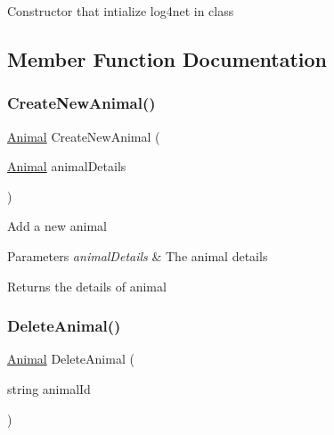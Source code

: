 Constructor that intialize log4net in class 



\subsection{Member Function Documentation}
\mbox{\label{classWildLifeTracker_1_1Repository_1_1AnimalRepo_a8242d740e31fff58cf32f374c7d35672}} 
\subsubsection{\texorpdfstring{Create\+New\+Animal()}{CreateNewAnimal()}}
{\footnotesize\ttfamily \hyperlink{classWildLifeTracker_1_1Models_1_1Animal}{Animal} Create\+New\+Animal (\begin{DoxyParamCaption}\item[{\hyperlink{classWildLifeTracker_1_1Models_1_1Animal}{Animal}}]{animal\+Details }\end{DoxyParamCaption})\hspace{0.3cm}{\ttfamily [inline]}}



Add a new animal 


\begin{DoxyParams}{Parameters}
{\em animal\+Details} & The animal details\\
\hline
\end{DoxyParams}
\begin{DoxyReturn}{Returns}
the details of animal 
\end{DoxyReturn}
\mbox{\label{classWildLifeTracker_1_1Repository_1_1AnimalRepo_aaa8df32c561515cee5569a3bbf1d82d9}} 
\subsubsection{\texorpdfstring{Delete\+Animal()}{DeleteAnimal()}}
{\footnotesize\ttfamily \hyperlink{classWildLifeTracker_1_1Models_1_1Animal}{Animal} Delete\+Animal (\begin{DoxyParamCaption}\item[{string}]{animal\+Id }\end{DoxyParamCaption})\hspace{0.3cm}{\ttfamily [inline]}}



